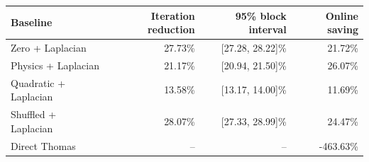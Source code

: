 \begin{tabular}{lrrr}
\toprule
Baseline & Iteration reduction & 95\% block interval & Online saving \\
\midrule
Zero + Laplacian & 27.73\% & [27.28, 28.22]\% & 21.72\% \\
Physics + Laplacian & 21.17\% & [20.94, 21.50]\% & 26.07\% \\
Quadratic + Laplacian & 13.58\% & [13.17, 14.00]\% & 11.69\% \\
Shuffled + Laplacian & 28.07\% & [27.33, 28.99]\% & 24.47\% \\
Direct Thomas & -- & -- & -463.63\% \\
\bottomrule
\end{tabular}
